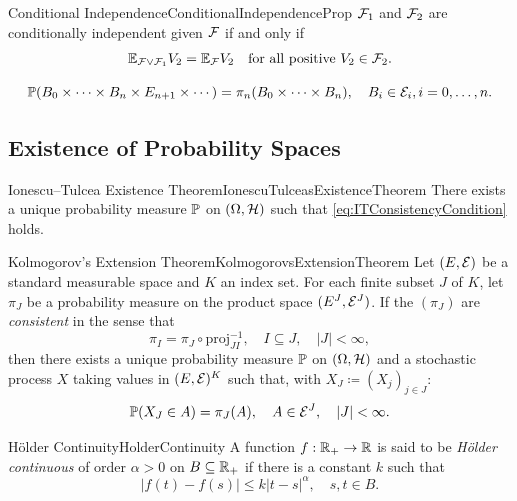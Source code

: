 \begin{prop}{Conditional Independence}{ConditionalIndependenceProp}
    \(\mathcal{F}_1\) and \(\mathcal{F}_2\) are conditionally independent given \(\mathcal{F}\) if and only if
    \begin{equation}\label{eq:ConditionalIndependenceProp}
        \mathbb{E}_{\mathcal{F} \vee \mathcal{F}_1} V_2 = \mathbb{E}_{\mathcal{F}} V_2 \quad \text{for all positive } V_2 \in \mathcal{F}_2.
    \end{equation}
\end{prop}

\begin{equation}\label{eq:ITConsistencyCondition}
    \mathbb{P}(B_0 \times \cdots \times B_n \times E_{n+1} \times \cdots) = \pi_n(B_0 \times \cdots \times B_n), \quad B_i \in \mathcal{E}_i, i = 0, \dots, n.
\end{equation}

\subsection{Existence of Probability Spaces}


\begin{thm}{Ionescu--Tulcea Existence Theorem}{IonescuTulceasExistenceTheorem}
    There exists a unique probability measure \(\mathbb{P}\) on \((\Omega, \mathcal{H})\) such that \cref{eq:ITConsistencyCondition} holds.
\end{thm}

\begin{thm}{Kolmogorov's Extension Theorem}{KolmogorovsExtensionTheorem}
    Let \((E, \mathcal{E})\) be a standard measurable space and \(K\) an index set. For each finite subset \(J\) of \(K\), let \(\pi_J\) be a probability measure on the product space \((E^J, \mathcal{E}^J)\). If the \((\pi_J)\) are \emph{consistent} in the sense that
    \begin{equation*}
        \pi_I = \pi_J \circ \mathrm{proj}_{JI}^{-1}, \quad I \subseteq J, \quad |J| < \infty,
    \end{equation*}
    then there exists a unique probability measure \(\mathbb{P}\) on \((\Omega, \mathcal{H})\) and a stochastic process \(X\) taking values in \((E, \mathcal{E})^K\) such that, with \(X_J \coloneqq (X_j)_{j \in J}\):
    \begin{equation*}
        \mathbb{P}(X_J \in A) = \pi_J(A), \quad A \in \mathcal{E}^J, \quad |J| < \infty.
    \end{equation*}
\end{thm}

\begin{defn}{Hölder Continuity}{HolderContinuity}
    A function \(f : \mathbb{R}_+ \to \mathbb{R}\) is said to be \emph{Hölder continuous} of order \(\alpha > 0\) on \(B \subseteq \mathbb{R}_+\) if there is a constant \(k\) such that
    \begin{equation*}
        |f(t) - f(s)| \leq k |t - s|^\alpha, \quad s, t \in B.
    \end{equation*}
\end{defn}


